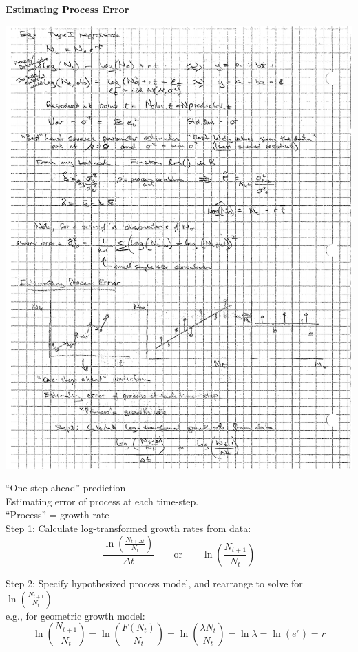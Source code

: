 \documentclass{article}
\newcommand{\ind}{\-\hspace{1cm}}
\begin{document}
\textbf{Estimating Process Error}
\begin{center}
	\includegraphics[width=15cm]{figs/image2.pdf}
\end{center}
``One step-ahead'' prediction\\
\ind Estimating error of process at each time-step.\\
\ind \ind ``Process'' = growth rate\\

Step 1: Calculate log-transformed growth rates from data:\\
\begin{equation*}
	\frac{\ln\left(\frac{N_{t+\Delta t}}{N_t}\right)}{\Delta t} \quad \quad \text{or} \quad \quad \ln \left(\frac{N_{t+1}}{N_t}\right)
\end{equation*}

Step 2: Specify hypothesized process model, and rearrange to solve for $\ln \left(\frac{N_{t+1}}{N_t}\right)$\\
\ind e.g., for geometric growth model:\\
\begin{equation*}
	\ln\left(\frac{N_{t+1}}{N_t}\right) = \ln\left(\frac{F(N_t)}{N_t}\right) = \ln\left(\frac{\lambda N_t}{N_t}\right) = \ln \lambda = \ln (e^r) = r
\end{equation*}
\end{document}

